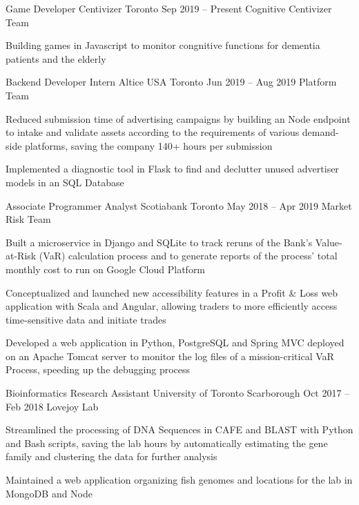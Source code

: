 \begin{cventries}
  \cventry
    {Game Developer}
    {Centivizer}
    {Toronto}
    {Sep 2019 -- Present}
    {Cognitive Centivizer Team}
    {
      \begin{cvitems}
        \item {Building games in Javascript to monitor congnitive functions for dementia patients and the elderly}
      \end{cvitems}
    }
  \cventry
    {Backend Developer Intern}
    {Altice USA}
    {Toronto}
    {Jun 2019 -- Aug 2019}
    {Platform Team}
    {
    \begin{cvitems}
      \item {Reduced submission time of advertising campaigns by building an Node endpoint to intake and validate assets according to the requirements of various demand-side platforms, saving the company 140+ hours per submission}
      \item {Implemented a diagnostic tool in Flask to find and declutter unused advertiser models in an SQL Database}
    \end{cvitems}
    }
  \cventry
    {Associate Programmer Analyst}
    {Scotiabank}
    {Toronto}
    {May 2018 -- Apr 2019}
    {Market Risk Team}
    {
      \begin{cvitems}
        \item {Built a microservice in Django and SQLite to track reruns of the Bank's Value-at-Risk (VaR) calculation process and to generate reports of the process' total monthly cost to run on Google Cloud Platform}
        \item {Conceptualized and launched new accessibility features in a Profit \& Loss web application with Scala and Angular, allowing traders to more efficiently access time-sensitive data and initiate trades}
        \item {Developed a web application in Python, PostgreSQL and Spring MVC deployed on an Apache Tomcat server to monitor the log files of a mission-critical VaR Process, speeding up the debugging process}
      \end{cvitems}
    }

  \cventry
    {Bioinformatics Research Assistant}
    {University of Toronto}
    {Scarborough}
    {Oct 2017 -- Feb 2018}
    {Lovejoy Lab}
    {
      \begin{cvitems}
        \item {Streamlined the processing of DNA Sequences in CAFE and BLAST with Python and Bash scripts, saving the lab hours by automatically estimating the gene family and clustering the data for further analysis}
        \item {Maintained a web application organizing fish genomes and locations for the lab in MongoDB and Node}
      \end{cvitems}
    }
\end{cventries}
